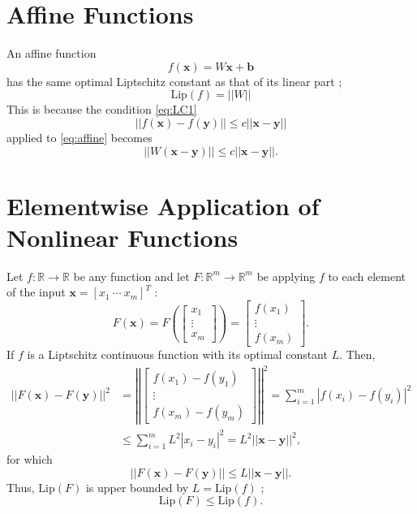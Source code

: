 \documentclass[12pt]{report}
\numberwithin{figure}{chapter}
\theoremstyle{plain}
\theoremstyle{definition}
\theoremstyle{corollary}
\theoremstyle{definition}
\theoremstyle{plain}
\theoremstyle{definition}
\theoremstyle{plain}
\newcommand\bx{\ensuremath{\boldsymbol x}}
\newcommand\by{\ensuremath{\boldsymbol y}}
\newcommand\bb{\ensuremath{\boldsymbol b}}
\newcommand\lip{\ensuremath{\text{Lip}}}
\begin{document}
\section{Affine Functions}
An affine function 
\begin{equation}\label{eq:affine}
f(\bx)=W\bx+\bb
\end{equation}
has the same optimal Liptschitz constant as that of its linear part ; 
\begin{equation}\label{eq:affine_LC}
\lip(f)=||W||
\end{equation}
This is because the condition \eqref{eq:LC1} 
\[
||f(\bx)-f(\by)||\le c||\bx-\by||
\]
applied to \eqref{eq:affine} becomes
\[
||W(\bx-\by)||\le c||\bx-\by||.
\]

\section{Elementwise Application of Nonlinear Functions}
Let \(f:\mathbb R\to\mathbb R\) be any function and let \(F:\mathbb R^m\to\mathbb R^m\) be applying \(f\) to each element of the input \(\bx = [x_1\:\cdots\:x_m]^T\) :
\begin{equation}\label{eq:elementwise}
F(\bx)=F\left(\begin{bmatrix}x_1\\\vdots\\x_m\end{bmatrix}\right)=
\begin{bmatrix}f(x_1)\\\vdots\\f(x_m)\end{bmatrix}.
\end{equation}
If \(f\) is a Liptschitz continuous function with its optimal constant \(L\).
Then,
\begin{align*}
||F(\bx)-F(\by)||^2
&=\left|\left|\begin{bmatrix}f(x_1)-f(y_1)\\\vdots\\f(x_m)-f(y_m)\end{bmatrix}\right|\right|^2
=\sum_{i=1}^m|f(x_i)-f(y_i)|^2\\
&\le\sum_{i=1}^mL^2|x_i-y_i|^2=L^2||\bx-\by||^2,
\end{align*}
for which
\[||F(\bx)-F(\by)||\le L||\bx-\by||.\]
Thus, \(\lip(F)\) is upper bounded by \(L=\lip(f)\) ;
\begin{equation}\label{eq:elementwise_LC}
\lip(F)\le\lip(f).
\end{equation}
\end{document}
